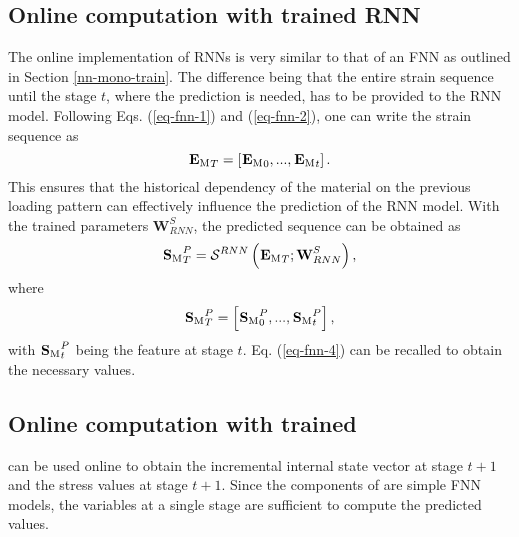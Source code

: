 \subsection{Online computation with trained RNN}\label{nn-dnn-online}
The online implementation of RNNs is very similar to that of an FNN as outlined in Section \ref{nn-mono-train}. The difference being that the entire strain sequence until the stage $ t $, where the prediction is needed, has to be provided to the RNN model. Following Eqs. (\ref{eq-fnn-1}) and (\ref{eq-fnn-2}), one can write the strain sequence as
\begin{equation}\label{eq-rnn-1}
{^{}\textbf{E}_\text{M}}_T=\left[{^{}\textbf{E}_\text{M}}_0,...,{^{}\textbf{E}_\text{M}}_t\right].
\end{equation}
This ensures that the historical dependency of the material on the previous loading pattern can effectively influence the prediction of the RNN model. With the trained parameters $ \textbf{W}^S_{RNN} $, the predicted sequence can be obtained as
\begin{equation}\label{eq-rnn-2}
{^{}\textbf{S}_\text{M}}_T^P=\mathcal{S}^{RNN}\left({^{}\textbf{E}_\text{M}}_T;\textbf{W}^S_{RNN}\right),
\end{equation}
where 
\begin{equation}\label{eq-rnn-3}
{^{}\textbf{S}_\text{M}}_T^P=\left[{^{}\textbf{S}_\text{M}}_0^P,...,{^{}\textbf{S}_\text{M}}_t^P\right],
\end{equation}
with $ {^{}\textbf{S}_\text{M}}_t^P $ being the feature at stage $ t $. Eq. (\ref{eq-fnn-4}) can be recalled to obtain the necessary values.
 
\subsection{Online computation with trained \fnn}\label{nn-fnn2-online}
\fnn can be used online to obtain the incremental internal state vector at stage $ t+1 $ and the stress values at stage $ t+1 $. Since the components of \fnn are simple FNN models, the variables at a single stage are sufficient to compute the predicted values.


